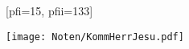 [pfi={15}, pfii={133}]

\beginverse
\endverse
\centering\texttt{[image: Noten/KommHerrJesu.pdf]}

\endsong